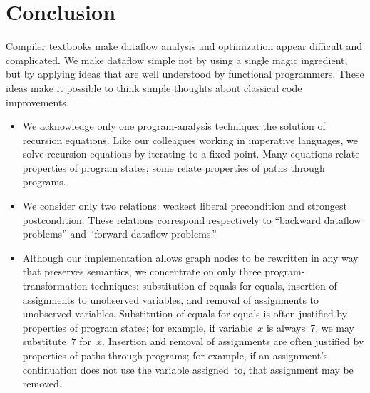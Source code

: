 \documentclass[blockstyle,preprint,natbib,nocopyrightspace]{sigplanconf}
\let\cite\citep
\newcommand{\authornote}[1]{{\em #1}}
\def\authornote#1{\unskip\relax}
\newcommand{\norman}[1]{\authornote{NR: #1}}
\let\remark\norman
\def\finalremark#1{\relax}
\newcommand\secref[1]{Section~\ref{sec:#1}}
\begin{document}
\section{Conclusion}

Compiler textbooks make dataflow analysis and optimization appear
difficult and complicated.
We make dataflow simple not by using a single magic
ingredient, but by applying ideas that are well understood by functional
programmers. %
These ideas
make it possible to think simple thoughts about classical code improvements.
\begin{itemize}
\item
We acknowledge only one program-analysis technique: the solution of
recursion equations.
Like our colleagues working in imperative languages, we solve
recursion equations by iterating to a fixed point.
Many equations relate
properties of program states; some relate properties of paths through
programs. 
\item
We consider only two
relations: weakest liberal precondition and strongest 
postcondition.
These relations correspond 
respectively
to
``backward dataflow problems'' and ``forward dataflow problems.''
\finalremark{Can we give an exmple of a property of program states which is
neither, just by way of contrast; ie this we cannot do.}
\item
Although our implementation allows graph nodes to be rewritten in any
way that preserves semantics, we concentrate on
only three program-transformation techniques:
substitution of equals for equals, 
insertion of assignments to unobserved variables, 
and removal of assignments to unobserved variables. 
Substitution of equals for equals is often justified by properties of program
states; for example, if variable~$x$
is always~7, we may substitute~7 for~$x$.\finalremark
{We can also justify substitution of \emph{labels} in goto
  statements by reasoning about continuations.  This is
  probably not the place to mention this fact.}
Insertion and removal of assignments are often justified by properties
of paths through programs;
for example, if an assignment's continuation does not use the variable
assigned~to, that assignment may be removed.


\end{itemize}
\end{document}
